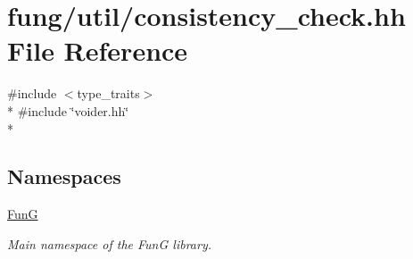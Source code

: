 \hypertarget{consistency__check_8hh}{}\section{fung/util/consistency\+\_\+check.hh File Reference}
\label{consistency__check_8hh}
{\ttfamily \#include $<$type\+\_\+traits$>$}\\*
{\ttfamily \#include \char`\"{}voider.\+hh\char`\"{}}\\*
\subsection*{Namespaces}
\begin{DoxyCompactItemize}
\item 
 \hyperlink{namespaceFunG}{Fun\+G}
\begin{DoxyCompactList}\small\item\em Main namespace of the Fun\+G library. \end{DoxyCompactList}\end{DoxyCompactItemize}
